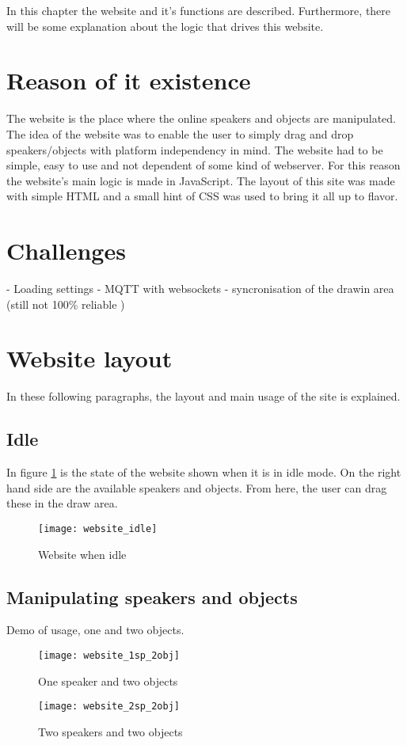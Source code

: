In this chapter the website and it's functions are described. Furthermore, there will be some explanation about the logic that drives this website.

\section{Reason of it existence}
The website is the place where the online speakers and objects are manipulated.
The idea of the website was to enable the user to simply drag and drop speakers/objects with platform independency in mind.
The website had to be simple, easy to use and not dependent of some kind of webserver.
For this reason the website's main logic is made in JavaScript. The layout of this site was made with simple HTML and a small hint of CSS was used to bring it all up to flavor.

\section{Challenges}
- Loading settings
- MQTT with websockets
- syncronisation of the drawin area (still not 100\% reliable )

\section{Website layout}
In these following paragraphs, the layout and main usage of the site is explained.

\subsection{Idle}
In figure \ref{fig:website_idle} is the state of the website shown when it is in idle mode.
On the right hand side are the available speakers and objects. From here, the user can drag these in the draw area.

\begin{figure}[H]
    \centering
    \texttt{[image: website\_idle]}
    \caption{Website when idle}
    \label{fig:website_idle}
\end{figure}

\subsection{Manipulating speakers and objects}

Demo of usage, one and two objects.
\begin{figure}[H]
    \centering
        \begin{minipage}[b]{0.5\textwidth}
            \centering
            \texttt{[image: website\_1sp\_2obj]}
            \caption{One speaker and two objects}
            \label{fig:website_1sp_2obj}
        \end{minipage}%
        \begin{minipage}[b]{0.5\textwidth}
            \centering
            \texttt{[image: website\_2sp\_2obj]}
            \caption{Two speakers and two objects}
            \label{fig:website_2sp_2obj}
    \end{minipage}
\end{figure}

